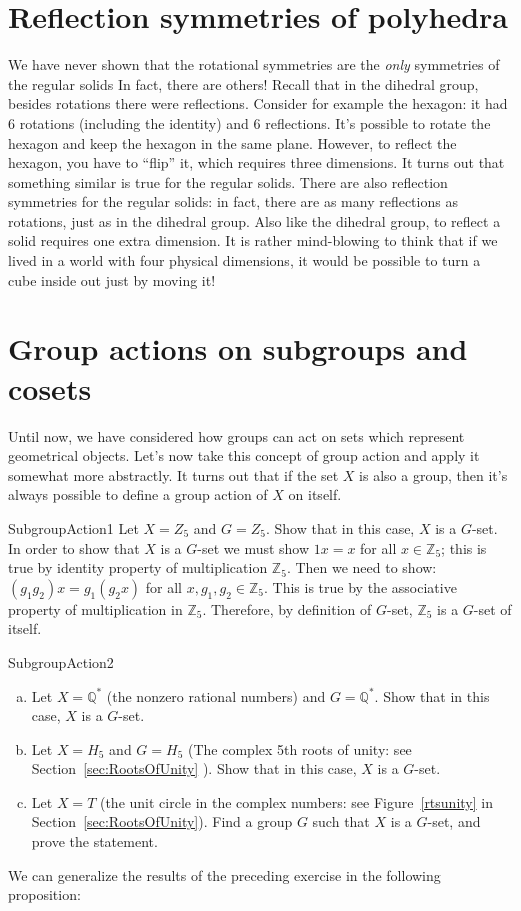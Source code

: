 \section{Reflection symmetries of polyhedra}
We have never shown that the rotational symmetries are the \emph{only}  symmetries of the regular solids In fact, there are others! Recall that in the dihedral group, besides rotations there were reflections. Consider for example the hexagon: it had 6 rotations (including the identity) and 6 reflections. It's possible to rotate the hexagon and keep the hexagon in the same plane. However, to reflect the hexagon, you have to ``flip'' it, which requires three dimensions.  It turns out that something similar is true for the regular solids. There are also reflection symmetries for the regular solids: in fact, there are as many reflections as rotations, just as in the dihedral group. Also like the dihedral group, to reflect a solid requires one extra dimension. It is rather mind-blowing to think that if we lived in a world with four physical dimensions, it would be possible to turn a cube inside out just by moving it!
\section{Group actions on subgroups and cosets}\label{SubgroupsAndCosets}
Until now, we have considered how groups can act on sets which represent geometrical objects. Let's now take this concept of group action and apply it somewhat more abstractly.   It turns out that if the set $X$ is also a group, then it's always possible to define a group action of $X$ on itself.

\begin{example}{SubgroupAction1}
Let $X= Z_5$  and $G = Z_5$. Show that in this case, $X$ is a $G$-set.
In order to show that $X$ is a $G$-set we must show $1x = x$ for all $x \in\mathbb {Z}_5$; this is true by identity property of multiplication $\mathbb{Z}_5$.  Then we need to show: $(g_1g_2)x = g_1(g_2x)$ for all $x, g_1,g_2 \in\mathbb{ Z}_5$. This is true by the associative property of multiplication in $\mathbb {Z}_5$.  Therefore, by definition of $G$-set, $\mathbb{Z}_5$ is a $G$-set of itself.
\end {example}

\begin {exercise}{SubgroupAction2}
\begin {enumerate} [(a)]
\item Let $X =\mathbb{ Q}^* $ (the nonzero rational numbers) and $G = \mathbb{Q}^*$. Show that in this case, $X$ is a $G$-set.

\item Let $X = H_5$ and $G = H_5$ (The complex 5th roots of unity:  see Section~\ref{sec:RootsOfUnity}  ). Show that in this case, $X$ is a $G$-set.
\item Let $X = T$ (the unit circle in the complex numbers:  see Figure~\ref{rtsunity} in Section~\ref{sec:RootsOfUnity}).  Find a group $G$ such that $X$ is a $G$-set, and prove the statement.
\end{enumerate}
\end {exercise}
We can generalize the results of the preceding exercise in the following proposition:

